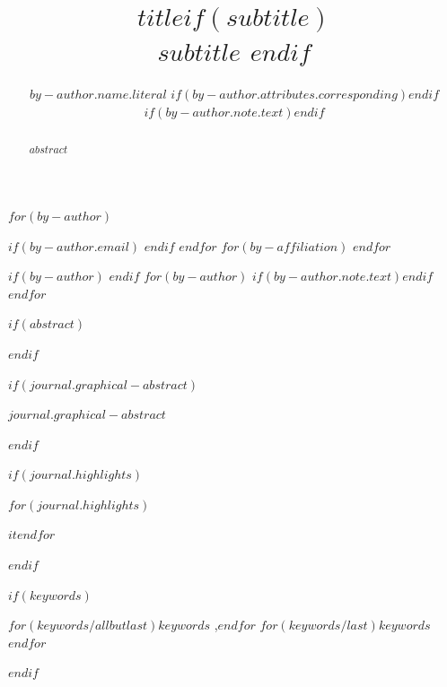 
\begin{frontmatter}
\title{$title$$if(subtitle)$ \\\large{$subtitle$} $endif$}
$for(by-author)$\author[$for(by-author.affiliations)$$it.number$$sep$,$endfor$]{$by-author.name.literal$%
$if(by-author.attributes.corresponding)$$endif$%
$if(by-author.note.text)$$endif$}
$if(by-author.email)$  $endif$
$endfor$
$for(by-affiliation)$
$endfor$

$if(by-author)$
$endif$
$for(by-author)$
$if(by-author.note.text)$$endif$
$endfor$
        
$if(abstract)$
\begin{abstract}
$abstract$
\end{abstract}
$endif$

$if(journal.graphical-abstract)$\begin{graphicalabstract}
$journal.graphical-abstract$
\end{graphicalabstract}
$endif$

$if(journal.highlights)$\begin{highlights}
$for(journal.highlights)$\item $it$$endfor$
\end{highlights}
$endif$

$if(keywords)$
\begin{keyword}
    $for(keywords/allbutlast)$$keywords$ \sep $endfor$
    $for(keywords/last)$$keywords$$endfor$
\end{keyword}
$endif$
\end{frontmatter}
    
